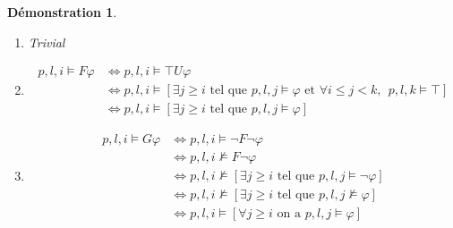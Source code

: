 \documentclass[12pt,a4paper]{article}
\theoremstyle{plain}
\newtheorem{dem}{Démonstration}
\theoremstyle{definition}
\begin{document}
\begin{dem}
	\leavevmode
	\begin{enumerate}
		\item Trivial
		\item
		\begin{align*}
			p,l,i \models F\varphi &\Leftrightarrow p,l,i \models \top U \varphi \\
			&\Leftrightarrow p,l,i \models [\exists j \geq i \textrm{ tel que } p,l,j \models \varphi \textrm{ et } \forall i \leq j < k, \:\: p,l,k\models \top] \\
			&\Leftrightarrow p,l,i \models [\exists j \geq i \text{ tel que } p,l,j \models \varphi]
		\end{align*}
		\item
		\begin{align*}
			p,l,i \models G \varphi &\Leftrightarrow p,l,i \models \lnot F \lnot \varphi \\
			&\Leftrightarrow p,l,i \not \models F \lnot \varphi \\
			&\Leftrightarrow p,l,i \not \models [\exists j \geq i \textrm{ tel que } p,l,j \models \lnot \varphi] \\
			&\Leftrightarrow p,l,i \not \models [\exists j \geq i \textrm{ tel que } p,l,j \not \models \varphi] \\
			&\Leftrightarrow p,l,i \models [\forall j \geq i \textrm{ on a } p,l,j \models \varphi]
		\end{align*}
	\end{enumerate}
\end{dem}
\end{document}
